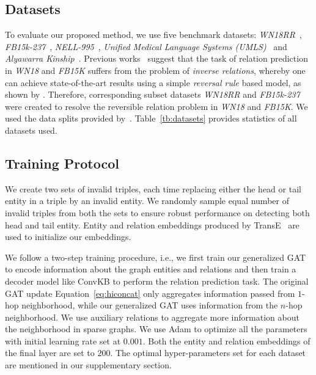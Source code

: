 \documentclass[11pt,a4paper]{article}
\begin{document}
\subsection{Datasets}
\label{ssec:datasets}
To evaluate our proposed method, we use five benchmark datasets: \emph{WN18RR}~\cite{dettmers2018convolutional}, 
 \emph{FB15k-237}~\cite{toutanova2015representing}, \emph{NELL-995}~\cite{xiong2017}, \emph{Unified Medical 
 Language Systems (UMLS)}~\cite{Kok:2007:SPI:1273496.1273551} and \emph{Alyawarra Kinship}~\cite{LinRX2018}. Previous works~\cite{toutanova2015representing,dettmers2018convolutional} suggest that the task of relation prediction in 
\emph{WN18} and \emph{FB15K} suffers from the problem of \emph{inverse relations}, whereby one can achieve state-of-the-art results using a simple \emph{reversal rule} 
based model, as shown by \cite{dettmers2018convolutional}. Therefore, corresponding subset datasets
 \emph{WN18RR} and \emph{FB15k-237} were created to resolve the reversible relation problem in \emph{WN18} and \emph{FB15K}. We used the data splits provided by~\cite{nguyen2018novel}. Table~\ref{tb:datasets} provides statistics of all datasets used.

\subsection{Training Protocol}
\label{ssec:training}
We create two sets of invalid triples, each time replacing either the head or tail entity in a triple by an invalid entity. 
We randomly sample equal number of invalid triples from both the sets to ensure robust performance on detecting both head and tail entity. Entity and relation embeddings produced by TransE~\cite{NIPS2013_5071,nguyen2018novel} are used to initialize our embeddings.


We follow a two-step training procedure, i.e., we first train our generalized GAT to encode information about the graph entities and relations and then train a decoder model like ConvKB \cite{nguyen2018novel} to perform the relation prediction task. The original GAT update Equation~\ref{eq:hiconcat} only aggregates information passed from \(1\)-hop neighborhood, while our generalized GAT uses information from the  \(n\)-hop neighborhood. We use auxiliary relations to aggregate more information about the neighborhood in sparse graphs. We use Adam to optimize all the parameters with initial learning rate set at $0.001$. Both the entity and relation embeddings of the final layer are set to $200$. The optimal hyper-parameters set for each dataset are mentioned in our supplementary section.
\end{document}
